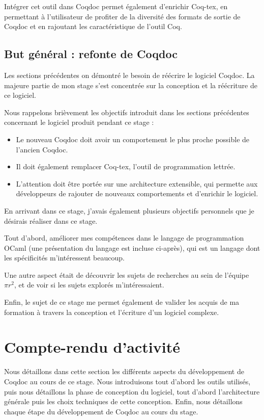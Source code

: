 \documentclass[a4paper, 11pt]{report}
\newcommand{\pir}[0]{\textbf{$\pi r^2$}\xspace}
\begin{document}
    Intégrer cet outil dans Coqdoc permet également d'enrichir Coq-tex, en
    permettant à l'utilisateur de profiter de la diversité des formats de
    sortie de Coqdoc et en rajoutant les caractéristique de l'outil Coq.

    \clearpage
    \subsection{But général : refonte de Coqdoc}
    Les sections précédentes on démontré le besoin de réécrire le logiciel
    Coqdoc. La majeure partie de mon stage s'est concentrée sur la conception
    et la réécriture de ce logiciel.

    Nous rappelons brièvement les objectifs introduit dans les sections
    précédentes concernant le logiciel produit pendant ce stage :
    \begin{itemize}
      \item Le nouveau Coqdoc doit avoir un comportement le plus proche
        possible de l'ancien Coqdoc.
      \item Il doit également remplacer Coq-tex, l'outil de programmation
        lettrée.
      \item L'attention doit être portée sur une architecture extensible, qui
        permette aux développeurs de rajouter de nouveaux comportements
        et d'enrichir le logiciel. \\
    \end{itemize}

    En arrivant dans ce stage, j'avais également plusieurs objectifs personnels
    que je désirais réaliser dans ce stage.

    Tout d'abord, améliorer
    mes compétences dans le langage de programmation OCaml (une présentation
    du langage est incluse ci-après), qui est un langage dont les spécificités
    m'intéressent beaucoup.

    Une autre aspect était de découvrir les sujets de recherches au sein de
    l'équipe \pir, et de voir si les sujets explorés m'intéressaient.

    Enfin, le sujet de ce stage me permet également de valider les acquis de
    ma formation à travers la conception et l'écriture d'un logiciel complexe.

  \section{Compte-rendu d'activité}
  Nous détaillons dans cette section les différents aspects du développement
  de Coqdoc au cours de ce stage.  Nous introduisons tout d'abord les outils
  utilisés, puis nous détaillons la phase de conception du logiciel, tout
  d'abord l'architecture générale puis les choix techniques de cette
  conception. Enfin, nous détaillons chaque étape du développement de Coqdoc
  au cours du stage.
\end{document}
